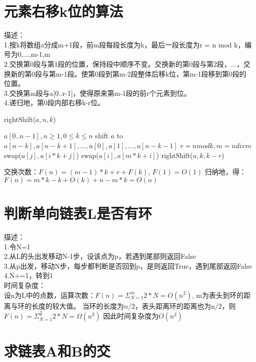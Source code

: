 \documentclass[UTF8]{ctexart}
\begin{document}
\section{元素右移k位的算法}%
描述：\\
1.按k将数组a分成m+1段，前m段每段长度为k，最后一段长度为r = n mod k，编号为0,...,m-1,m\\
2.交换第0段与第1段的位置，保持段中顺序不变。交换新的第0段与第2段，...，交换新的第0段与第m-1段。使第0段到第m-2段整体后移k位，第m-1段移到第0段的位置。\\
3.交换第m段与a[0..r-1]，使得原来第m-1段的前r个元素到位。\\
4.递归地，第0段内部右移k-r位。\\

\begin{algorithm}
\caption{rightShift($a,n,k$)}
\begin{algorithmic}
\REQUIRE $a[0..n-1], n \geq 1,0\leq k \leq n$
\ENSURE shift $a$ to $a[n-k], a[n-k+1], ..., a[0], a[1], ..., a[n-k-1]$
 \RETURN
\ENDIF
\STATE $r=n  mod  k, m = n  div  m$
		\STATE swap($a[j], a[i*k+j]$)
	\ENDFOR
\ENDFOR
{} \RETURN
\ENDIF
{}
	\STATE swap($a[i], a[m*k+i]$)
\ENDFOR	
\STATE rightShift($a,k,k-r$)
\RETURN
\end{algorithmic}
\end{algorithm}

交换次数：$F(n) = (m-1)*k + r + F(k)$, $F(1) = O(1)$
归纳地，得：$F(n) = m*k - k +O(k) + n - m*k = O(n)$

\section{判断单向链表L是否有环}%
描述：\\
1.令N=1\\
2.从L的头出发移动N-1步，设该点为p，若遇到尾部则返回False\\
3.从p出发，移动N步，每步都判断是否回到p，是则返回True，遇到尾部返回False\\
4.N+=1，转到1\\
时间复杂度：\\
设n为L中的点数，运算次数：$F(n) = \Sigma_{N=1}^{m} 2*N = O(n^2)$, m为表头到环的距离与环的长度的较大值。
当环的长度为$n/2$，表头距离环的距离也为n/2，则$F(n) = \Sigma_{N=1}^{\frac{n}{2}} 2*N = \Omega(n^2)$
因此时间复杂度为$O(n^2)$

\section{求链表A和B的交}%
\end{document}
